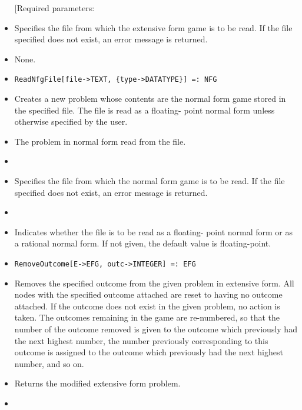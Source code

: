 \begin{itemize}
[Required parameters:

\bd
\item
[file:] Specifies the file from which the extensive form game is to be
read.  If the file specified does not exist, an error message is
returned.
\ed

\item
[Optional parameters:] None.
\ed

\item
\protect \large \begin{verbatim}
ReadNfgFile[file->TEXT, {type->DATATYPE}] =: NFG
\end{verbatim}\normalsize

\bd
\item
[Description:] Creates a new problem whose contents are the normal
form game stored in the specified file.  The file is read as a
floating- point normal form unless otherwise specified by the user.
\item
[Return value:] The problem in normal form read from the file.
\item
[Required parameters:]\hfil\null

\bd
\item
[file:] Specifies the file from which the normal form game is to be
read.  If the file specified does not exist, an error message is
returned.
\ed

\item
[Optional parameters:]\hfil\null
	

\bd
\item
[type:] Indicates whether the file is to be read as a floating- point
normal form or as a rational normal form.  If not given, the default
value is floating-point.
\ed
\ed

\item

\protect \large \begin{verbatim}
RemoveOutcome[E->EFG, outc->INTEGER] =: EFG
\end{verbatim}\normalsize

\bd
\item
[Description:] Removes the specified outcome from the given problem in
extensive form.  All nodes with the specified outcome attached are
reset to having no outcome attached.  If the outcome does not exist in
the given problem, no action is taken.  The outcomes remaining in the
game are re-numbered, so that the number of the outcome removed is
given to the outcome which previously had the next highest number, the
number previously corresponding to this outcome is assigned to the
outcome which previously had the next highest number, and so on.
\item  
[Return value:] Returns the modified extensive form problem.
\item
[Required parameters:]\hfil\null
	

\end{itemize}
